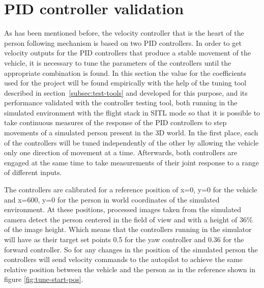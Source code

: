 

\clearpage

\section{PID controller validation}
\label{sec:test-1-pid}



As has been mentioned before, the velocity controller that is the heart of the person following mechanism is based on two PID controllers.
In order to get velocity outputs for the PID controllers that produce a stable movement of the vehicle, it is necessary to tune the parameters of the controllers until the appropriate combination is found.
In this section the value for the coefficients used for the project will be found empirically with the help of the tuning tool described in section~\ref{subsec:test-tools} and developed for this purpose, and its performance validated with the controller testing tool, both running in the simulated environment with the flight stack in SITL mode so that it is possible to take continuous measures of the response of the PID controllers to step movements of a simulated person present in the 3D world.
In the first place, each of the controllers will be tuned independently of the other by allowing the vehicle only one direction of movement at a time.
Afterwards, both controllers are engaged at the same time to take measurements of their joint response to a range of different inputs.

The controllers are calibrated for a reference position of x=0, y=0 for the vehicle and x=600, y=0 for the person in world coordinates of the simulated environment.
At these positions, processed images taken from the simulated camera detect the person centered in the field of view and with a height of 36\% of the image height.
Which means that the controllers running in the simulator will have as their target set points 0.5 for the yaw controller and 0.36 for the forward controller. So for any changes in the position of the simulated person the controllers will send velocity commands to the autopilot to achieve the same relative position between the vehicle and the person as in the reference shown in figure \ref{fig:tune-start-pos}.

